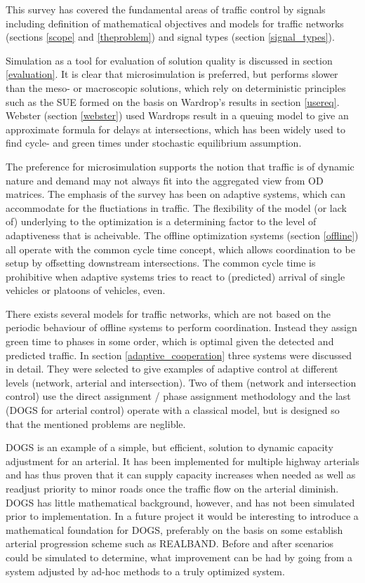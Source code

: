 \label{conclusion}
This survey has covered the fundamental areas of traffic control by signals including definition of mathematical objectives and models for traffic networks (sections \ref{scope} and \ref{theproblem}) and signal types (section \ref{signal_types}). 

Simulation as a tool for evaluation of solution quality is discussed in section \ref{evaluation}. It is clear that microsimulation is preferred, but performs slower than the meso- or macroscopic solutions, which rely on deterministic principles such as the SUE formed on the basis on Wardrop's results in section \ref{usereq}. Webster (section \ref{webster}) used Wardrops result in a queuing model to give an approximate formula for delays at intersections, which has been widely used to find cycle- and green times under stochastic equilibrium assumption.

The preference for microsimulation supports the notion that traffic is of dynamic nature and demand may not always fit into the aggregated view from OD matrices. The emphasis of the survey has been on adaptive systems, which can accommodate for the fluctiations in traffic. 
The flexibility of the model (or lack of) underlying to the optimization is a determining factor to the level of adaptiveness that is acheivable. The offline optimization systems (section \ref{offline}) all operate with the common cycle time concept, which allows coordination to be setup by offsetting downstream intersections. The common cycle time is prohibitive when adaptive systems tries to react to (predicted) arrival of single vehicles or platoons of vehicles, even.

There exists several models for traffic networks, which are not based on the periodic behaviour of offline systems to perform coordination. Instead they assign green time to phases in some order, which is optimal given the detected and predicted traffic. 
In section \ref{adaptive_cooperation} three systems were discussed in detail. They were selected to give examples of adaptive control at different levels (network, arterial and intersection). Two of them (network and intersection control) use the direct assignment / phase assignment methodology and the last (DOGS for arterial control) operate with a classical model, but is designed so that the mentioned problems are neglible.

DOGS is an example of a simple, but efficient, solution to dynamic capacity adjustment for an arterial. It has been implemented for multiple highway arterials and has thus proven that it can supply capacity increases when needed as well as readjust priority to minor roads once the traffic flow on the arterial diminish.
DOGS has little mathematical background, however, and has not been simulated prior to implementation. 
In a future project it would be interesting to introduce a mathematical foundation for DOGS, preferably on the basis on some establish arterial progression scheme such as REALBAND. Before and after scenarios could be simulated to determine, what improvement can be had by going from a system adjusted by ad-hoc methods to a truly optimized system.